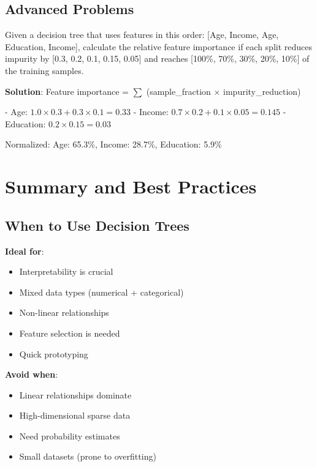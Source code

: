 \documentclass{article}
\newcounter{exercise}
\begin{document}
\subsection{Advanced Problems}

\begin{tcolorbox}[colback=gray!5!white,colframe=gray!75!black,title=Problem \stepcounter{exercise}\#\theexercise: Feature Importance Analysis]

Given a decision tree that uses features in this order: [Age, Income, Age, Education, Income], calculate the relative feature importance if each split reduces impurity by [0.3, 0.2, 0.1, 0.15, 0.05] and reaches [100\%, 70\%, 30\%, 20\%, 10\%] of the training samples.

\textbf{Solution}:
Feature importance = $\sum$ (sample\_fraction × impurity\_reduction)

- Age: $1.0 \times 0.3 + 0.3 \times 0.1 = 0.33$
- Income: $0.7 \times 0.2 + 0.1 \times 0.05 = 0.145$  
- Education: $0.2 \times 0.15 = 0.03$

Normalized: Age: 65.3\%, Income: 28.7\%, Education: 5.9\%
\end{tcolorbox}

\section{Summary and Best Practices}

\subsection{When to Use Decision Trees}

\textbf{Ideal for}:
\begin{itemize}
    \item Interpretability is crucial
    \item Mixed data types (numerical + categorical)
    \item Non-linear relationships
    \item Feature selection is needed
    \item Quick prototyping
\end{itemize}

\textbf{Avoid when}:
\begin{itemize}
    \item Linear relationships dominate
    \item High-dimensional sparse data
    \item Need probability estimates
    \item Small datasets (prone to overfitting)
\end{itemize}
\end{document}
